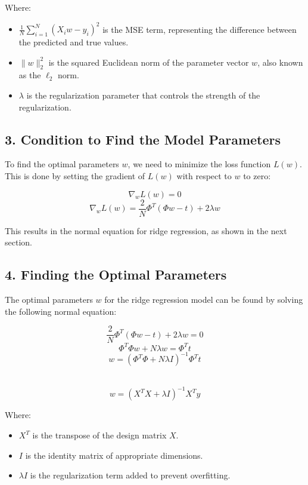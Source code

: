 Where:
\begin{itemize}
    \item \( \frac{1}{N} \sum_{i=1}^{N} (X_i w - y_i)^2 \) is the MSE term, representing the difference between the predicted and true values.
    \item \( \|w\|_2^2 \) is the squared Euclidean norm of the parameter vector \( w \), also known as the \( \ell_2 \) norm.
    \item \( \lambda \) is the regularization parameter that controls the strength of the regularization.
\end{itemize}

\subsection*{3. Condition to Find the Model Parameters}

To find the optimal parameters \( w \), we need to minimize the loss function \( L(w) \). This is done by setting the gradient of \( L(w) \) with respect to \( w \) to zero:

\[
\nabla_w L(w) = 0
\]
\[
\nabla_w L(w) = \frac{2}{N} \Phi^T (\Phi w - t) + 2 \lambda w
\]

This results in the normal equation for ridge regression, as shown in the next section.

\subsection*{4. Finding the Optimal Parameters}

The optimal parameters \( w \) for the ridge regression model can be found by solving the following normal equation:

\[
\frac{2}{N} \Phi^T (\Phi w - t) + 2 \lambda w = 0
\]
\[
\Phi^T \Phi w + N \lambda w = \Phi^T t
\]
\[
w = (\Phi^T \Phi + N \lambda I)^{-1} \Phi^T t
\]

\\


\[
w = (X^T X + \lambda I)^{-1} X^T y
\]


Where:
\begin{itemize}
    \item \( X^T \) is the transpose of the design matrix \( X \).
    \item \( I \) is the identity matrix of appropriate dimensions.
    \item \( \lambda I \) is the regularization term added to prevent overfitting.
\end{itemize}

